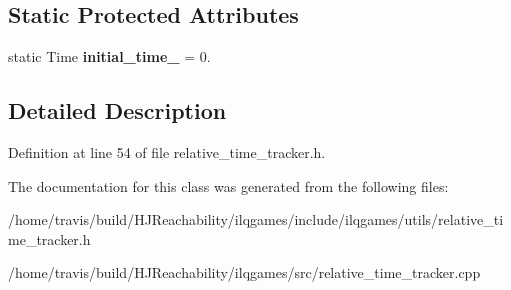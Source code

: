 \subsection*{Static Protected Attributes}
\begin{DoxyCompactItemize}
\item 
static Time {\bfseries initial\+\_\+time\+\_\+} = 0.\hypertarget{classilqgames_1_1_relative_time_tracker_ae1455e2eaad44c35d7f80b80776ae564}{}\label{classilqgames_1_1_relative_time_tracker_ae1455e2eaad44c35d7f80b80776ae564}

\end{DoxyCompactItemize}


\subsection{Detailed Description}


Definition at line 54 of file relative\+\_\+time\+\_\+tracker.\+h.



The documentation for this class was generated from the following files\+:\begin{DoxyCompactItemize}
\item 
/home/travis/build/\+H\+J\+Reachability/ilqgames/include/ilqgames/utils/relative\+\_\+time\+\_\+tracker.\+h\item 
/home/travis/build/\+H\+J\+Reachability/ilqgames/src/relative\+\_\+time\+\_\+tracker.\+cpp\end{DoxyCompactItemize}

